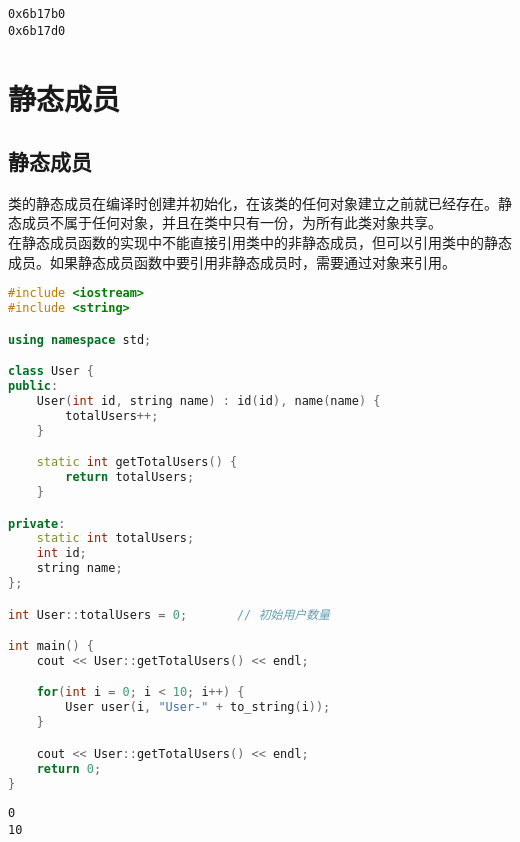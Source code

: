 \begin{tcolorbox}
	\begin{verbatim}
0x6b17b0
0x6b17d0
	\end{verbatim}
\end{tcolorbox}

\newpage

\section{静态成员}

\subsection{静态成员}

类的静态成员在编译时创建并初始化，在该类的任何对象建立之前就已经存在。静态成员不属于任何对象，并且在类中只有一份，为所有此类对象共享。 \\

在静态成员函数的实现中不能直接引用类中的非静态成员，但可以引用类中的静态成员。如果静态成员函数中要引用非静态成员时，需要通过对象来引用。 \\


\begin{lstlisting}[language=C++]
#include <iostream>
#include <string>

using namespace std;

class User {
public:
    User(int id, string name) : id(id), name(name) {
        totalUsers++;
    }

    static int getTotalUsers() {
        return totalUsers;
    }

private:
    static int totalUsers;
    int id;
    string name;
};

int User::totalUsers = 0;       // 初始用户数量

int main() {
    cout << User::getTotalUsers() << endl;

    for(int i = 0; i < 10; i++) {
        User user(i, "User-" + to_string(i));
    }

    cout << User::getTotalUsers() << endl;
    return 0;
}
\end{lstlisting}

\begin{tcolorbox}
	\begin{verbatim}
0
10
	\end{verbatim}
\end{tcolorbox}

